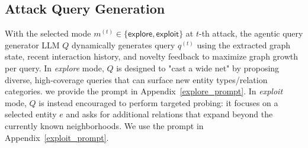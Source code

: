 \subsection{Attack Query Generation}
\label{query_generator}
With the selected mode $m^{(t)}\in\{\textsf{explore}, \textsf{exploit}\}$ at $t$-th attack, the agentic query generator LLM $Q$ dynamically generates query $q^{(t)}$ using the extracted graph state, recent interaction history, and novelty feedback to maximize graph growth per query.
In \emph{explore} mode, $Q$ is designed to "cast a wide net" by proposing diverse, high-coverage queries that can surface new entity types/relation categories. 
we provide the prompt in Appendix~\ref{explore_prompt}. 
In \emph{exploit} mode, $Q$ is instead encouraged to perform targeted probing: it focuses on a selected entity $e$ and asks for additional relations that expand beyond the currently known neighborhoods. We use the prompt in Appendix~\ref{exploit_prompt}.


